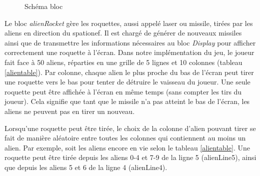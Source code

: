 \documentclass[french]{nakrule}
\begin{document}
\begin{figure}
\caption{Schéma bloc}
\label{alienRocketBloc}
\end{figure}

Le bloc \emph{alienRocket} gère les roquettes, aussi appelé laser ou missile, tirées par
les aliens en direction du spationef. Il est chargé de générer de nouveaux
missiles ainsi que de transmettre les informations nécessaires au bloc \emph{Display} pour afficher
correctement une roquette à l'écran.
Dans notre implémentation du jeu, le joueur fait face à 50 aliens, réparties en
une grille de 5 lignes et 10 colonnes (tableau \ref{alientable}). Par colonne,
chaque alien le plus proche du bas de l'écran peut tirer une roquette vers le
bas pour tenter de détruire le vaisseau du joueur. Une seule roquette peut être
affichée à l'écran en même temps (sans compter les tirs du joueur). Cela signifie
que tant que le missile n'a pas atteint le bas de l'écran, les aliens ne peuvent
pas en tirer un nouveau.

Lorsqu'une roquette peut être tirée, le choix de la colonne d'alien pouvant tirer
se fait de manière aléatoire entre toutes les colonnes qui contiennent au moins un
alien. Par exemple, soit les aliens encore en vie selon le tableau
\ref{alientable}. Une roquette peut être tirée depuis les aliens 0-4 et 7-9 de la
ligne 5 (alienLine5), ainsi que depuis les aliens 5 et 6 de la ligne 4 (alienLine4).
\end{document}
